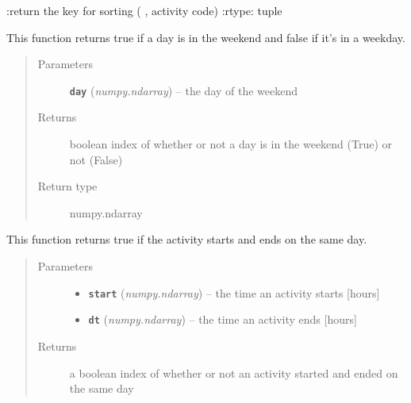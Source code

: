 \documentclass[letterpaper,10pt,english]{sphinxmanual}
\begin{document}
\begin{fulllineitems}
\begin{fulllineitems}
:return the key for sorting ( , activity code)
:rtype: tuple

\end{fulllineitems}


\begin{fulllineitems}
\label{diary:diary.Diary.is_weekend}
This function returns true if a day is in the weekend and false if it's in a weekday.
\begin{quote}\begin{description}
\item[{Parameters}] \leavevmode
\textbf{\texttt{day}} (\emph{numpy.ndarray}) -- the day of the weekend

\item[{Returns}] \leavevmode
boolean index of whether or not a day is in the weekend (True) or not (False)

\item[{Return type}] \leavevmode
numpy.ndarray

\end{description}\end{quote}

\end{fulllineitems}


\begin{fulllineitems}
\label{diary:diary.Diary.same_day}
This function returns true if the activity starts and ends on the same day.
\begin{quote}\begin{description}
\item[{Parameters}] \leavevmode\begin{itemize}
\item {} 
\textbf{\texttt{start}} (\emph{numpy.ndarray}) -- the time an activity starts {[}hours{]}

\item {} 
\textbf{\texttt{dt}} (\emph{numpy.ndarray}) -- the time an activity ends {[}hours{]}

\end{itemize}

\item[{Returns}] \leavevmode
a boolean index of whether or not an activity started and ended on the same day


\end{description}
\end{quote}
\end{fulllineitems}
\end{fulllineitems}
\end{document}
